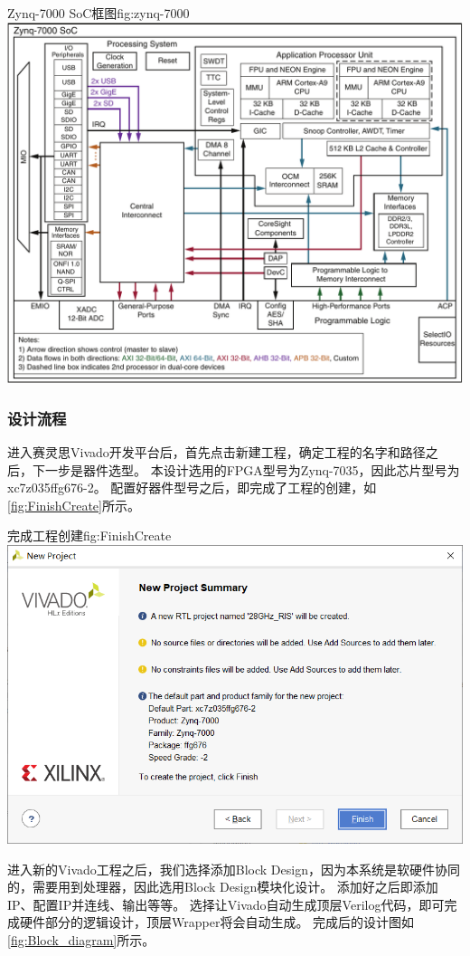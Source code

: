 \documentclass[supercite]{HustGraduPaper}
\begin{document}
\begin{generalfig}[htb]{Zynq-7000 SoC框图}{fig:zynq-7000}
	\includegraphics[width=0.8\linewidth]{Figures/zynq-7000.pdf}
\end{generalfig}

\subsubsection{设计流程}

进入赛灵思Vivado开发平台后，首先点击新建工程，确定工程的名字和路径之后，下一步是器件选型。
本设计选用的FPGA型号为Zynq-7035，因此芯片型号为xc7z035ffg676-2。
配置好器件型号之后，即完成了工程的创建，如\autoref{fig:FinishCreate}所示。

\begin{generalfig}[htb]{完成工程创建}{fig:FinishCreate}
	\includegraphics[width=0.8\linewidth]{Figures/FinishCreate.png}
\end{generalfig}

进入新的Vivado工程之后，我们选择添加Block Design，因为本系统是软硬件协同的，需要用到处理器，因此选用Block Design模块化设计。
添加好之后即添加IP、配置IP并连线、输出等等。
选择让Vivado自动生成顶层Verilog代码，即可完成硬件部分的逻辑设计，顶层Wrapper将会自动生成。
完成后的设计图如\autoref{fig:Block_diagram}所示。
\end{document}

